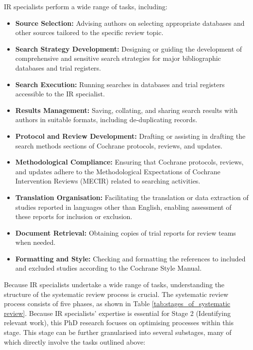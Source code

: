 \documentclass[10pt,oneside]{book}
\begin{document}
IR specialists perform a wide range of tasks, including:

\begin{itemize}
\item {\bf{Source Selection:}} Advising authors on selecting appropriate databases and other sources tailored to the specific review topic.
\item {\bf{Search Strategy Development:}} Designing or guiding the development of comprehensive and sensitive search strategies for major bibliographic databases and trial registers.
\item {\bf{Search Execution:}} Running searches in databases and trial registers accessible to the IR specialist.
\item {\bf{Results Management:}} Saving, collating, and sharing search results with authors in suitable formats, including de-duplicating records.
\item {\bf{Protocol and Review Development:}} Drafting or assisting in drafting the search methods sections of Cochrane protocols, reviews, and updates.
\item {\bf{Methodological Compliance:}} Ensuring that Cochrane protocols, reviews, and updates adhere to the Methodological Expectations of Cochrane Intervention Reviews (MECIR) related to searching activities.
\item {\bf{Translation Organisation:}} Facilitating the translation or data extraction of studies reported in languages other than English, enabling assessment of these reports for inclusion or exclusion.
\item {\bf{Document Retrieval:}} Obtaining copies of trial reports for review teams when needed.
\item {\bf{Formatting and Style:}} Checking and formatting the references to included and excluded studies according to the Cochrane Style Manual.
\end{itemize}

Because IR specialists undertake a wide range of tasks, understanding the structure of the systematic review process is crucial. The systematic review process consists of five phases, as shown in Table \ref{tab:stages_of_systematic review}. Because IR specialists' expertise is essential for Stage 2 (Identifying relevant work), this PhD research focuses on optimising processes within this stage. This stage can be further granularised into several substages, many of which directly involve the tasks outlined above:
\end{document}
